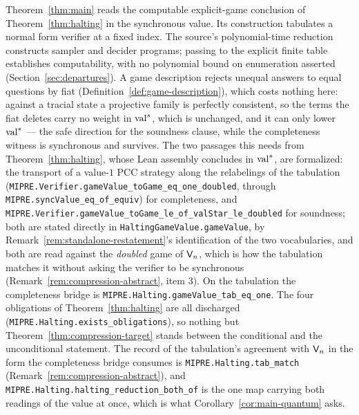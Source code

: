 Theorem~\ref{thm:main} reads the computable explicit-game conclusion of
Theorem~\ref{thm:halting} in the synchronous value. Its construction tabulates a
normal form verifier at a fixed index. The source's polynomial-time reduction
constructs sampler and decider programs; passing to the explicit finite table
establishes computability, with no polynomial bound on enumeration asserted
(Section~\ref{sec:departures}). A game
description rejects unequal answers to equal questions by fiat
(Definition~\ref{def:game-description}), which costs nothing here: against a tracial state
a projective family is perfectly consistent, so the terms the fiat deletes carry no weight
in $\mathrm{val}^{s}$, which is unchanged, and it can only lower $\mathrm{val}^*$ --- the safe direction
for the soundness clause, while the completeness witness is synchronous and survives.
The two passages this needs from Theorem~\ref{thm:halting}, whose Lean assembly concludes in
$\mathrm{val}^*$, are formalized: the transport of a value-$1$ PCC strategy along the relabelings of
the tabulation (\texttt{MIPRE.Verifier.gameValue\_toGame\_eq\_one\_doubled}, through
\texttt{MIPRE.syncValue\_eq\_of\_equiv}) for completeness, and
\texttt{MIPRE.Verifier.gameValue\_toGame\_le\_of\_valStar\_le\_doubled} for soundness; both are
stated directly in \texttt{HaltingGameValue.gameValue}, by
Remark~\ref{rem:standalone-restatement}'s identification of the two vocabularies, and both are
read against the \emph{doubled} game of $\mathsf{V}_n$, which is how the tabulation matches it
without asking the verifier to be synchronous (Remark~\ref{rem:compression-abstract}, item 3).
On the tabulation the completeness bridge is \texttt{MIPRE.Halting.gameValue\_tab\_eq\_one}.
The four obligations of Theorem~\ref{thm:halting} are all discharged
(\texttt{MIPRE.Halting.exists\_obligations}), so nothing but Theorem~\ref{thm:compression-target}
stands between the conditional and the unconditional statement. The record of the
tabulation's agreement with $\mathsf{V}_n$ in the form the completeness bridge consumes is
\texttt{MIPRE.Halting.tab\_match} (Remark~\ref{rem:compression-abstract}), and
\texttt{MIPRE.Halting.halting\_reduction\_both\_of} is the one map carrying both readings
of the value at once, which is what Corollary~\ref{cor:main-quantum} asks.

